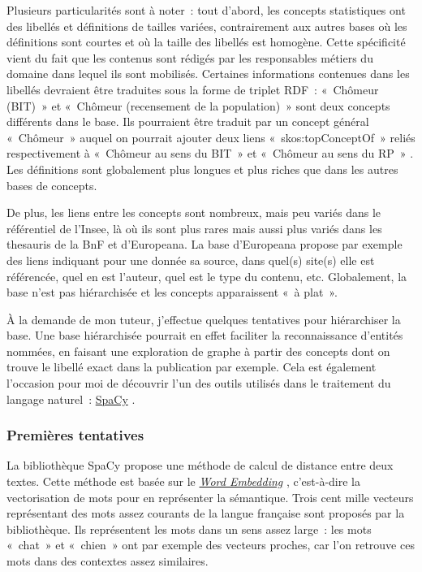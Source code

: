 Plusieurs particularités sont à noter~: tout d'abord, les concepts statistiques ont des libellés et définitions de tailles variées, contrairement aux autres bases où les définitions sont courtes et où la taille des libellés est homogène. Cette spécificité vient du fait que les contenus sont rédigés par les responsables métiers du domaine dans lequel ils sont mobilisés. Certaines informations contenues dans les libellés devraient être traduites sous la forme de triplet RDF~: «~Chômeur (BIT)~» et «~Chômeur (recensement de la population)~» sont deux concepts différents dans le base. Ils pourraient être traduit par un concept général «~Chômeur~» auquel on pourrait ajouter deux liens «~skos:topConceptOf~» reliés respectivement à «~Chômeur au sens du BIT~» et «~Chômeur au sens du RP~» . Les définitions sont globalement plus longues et plus riches que dans les autres bases de concepts.

De plus, les liens entre les concepts sont nombreux, mais peu variés dans le référentiel de l'Insee, là où ils sont plus rares mais aussi plus variés dans les thesauris de la BnF et d'Europeana. La base d'Europeana propose par exemple des liens indiquant pour une donnée sa source, dans quel(s) site(s) elle est référencée, quel en est l'auteur, quel est le type du contenu, etc. Globalement, la base n'est pas hiérarchisée et les concepts apparaissent «~à plat~».
\newline

À la demande de mon tuteur, j'effectue quelques tentatives pour hiérarchiser la base. Une base hiérarchisée pourrait en effet faciliter la reconnaissance d'entités nommées, en faisant une exploration de graphe à partir des concepts dont on trouve le libellé exact dans la publication par exemple. Cela est également l'occasion pour moi de découvrir l'un des outils utilisés dans le traitement du langage naturel~: \href{https://spacy.io/}{SpaCy} \cite{spacy2}.
\label{section 1.2.1}

\subsubsection*{Premières tentatives}
La bibliothèque SpaCy propose une méthode de calcul de distance entre deux textes. Cette méthode est basée sur le \href{https://en.wikipedia.org/wiki/Word_embedding}{\textit{Word Embedding}} \cite{word-embedding} \cite{word-embedding-opencls}, c'est-à-dire la vectorisation de mots pour en représenter la sémantique. Trois cent mille vecteurs représentant des mots assez courants de la langue française sont proposés par la bibliothèque. Ils représentent les mots dans un sens assez large~: les mots «~chat~» et «~chien~» ont par exemple des vecteurs proches, car l'on retrouve ces mots dans des contextes assez similaires.
\newline

